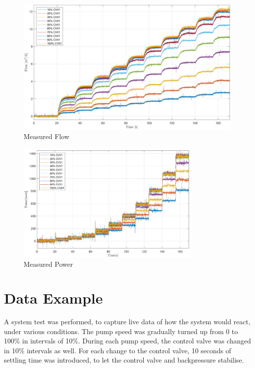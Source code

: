 \begin{figure}[ht]
	\centering
	\includegraphics[scale=0.5]{figures/05mathematicalModelling/measuredFlow.pdf}
	\vspace{-5mm}
	\caption{Measured Flow}
	\label{fig:measuredFlow}
\end{figure}
\vspace{-5mm}
\begin{figure}[ht]
	\centering
	\includegraphics[width=0.81\textwidth]{figures/05mathematicalModelling/measuredPower.pdf}
	\vspace{-5mm}
	\caption{Measured Power}
	\label{fig:measuredPower}
\end{figure}


\section{Data Example}\label{sec:results}
A system test was performed, 
to capture live data of how the system would react, 
under various conditions.
The pump speed was gradually turned up from 0 to 100\% in intervals of 10\%. 
During each pump speed, the control valve was changed in 10\% intervals as well. 
For each change to the control valve, 
10 seconds of settling time was introduced, 
to let the control valve and backpressure stabilise.

